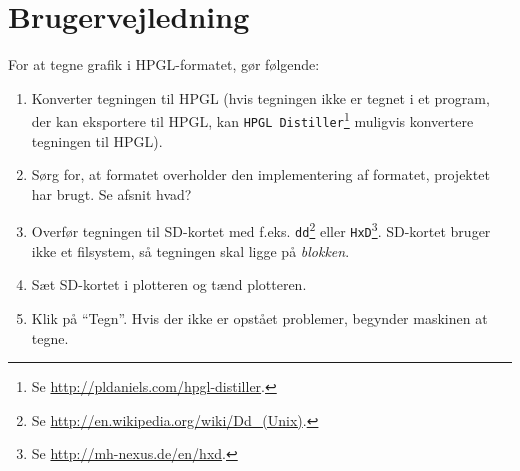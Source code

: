 \chapter{Brugervejledning}


For at tegne grafik i HPGL-formatet, gør følgende:

\begin{enumerate}
\item Konverter tegningen til HPGL (hvis tegningen ikke er tegnet i et
  program, der kan eksportere til HPGL, kan \texttt{HPGL
    Distiller}\footnote{Se \url{http://pldaniels.com/hpgl-distiller}.}
  muligvis konvertere tegningen til HPGL).
\item Sørg for, at formatet overholder den implementering af formatet,
  projektet har brugt. Se afsnit hvad?
\item Overfør tegningen til SD-kortet med
  f.eks. \texttt{dd}\footnote{Se
    \url{http://en.wikipedia.org/wiki/Dd_(Unix)}.} eller
  \texttt{HxD}\footnote{Se
    \url{http://mh-nexus.de/en/hxd}.}. SD-kortet bruger ikke et
  filsystem, så tegningen skal ligge på \textit{blokken}.
\item Sæt SD-kortet i plotteren og tænd plotteren.
\item Klik på \enquote{Tegn}. Hvis der ikke er opstået problemer,
  begynder maskinen at tegne.
\end{enumerate}


